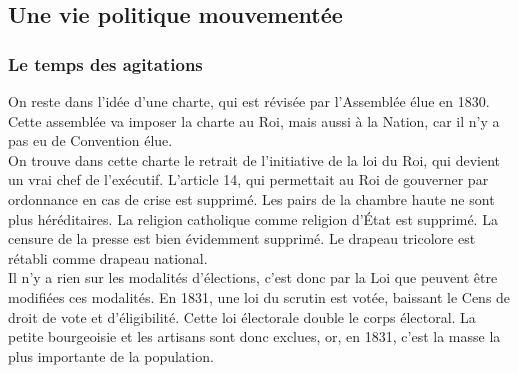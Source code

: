 \documentclass[10pt, a4paper, openany]{book}
\begin{document}
\subsection{Une vie politique mouvementée}

\subsubsection{Le temps des agitations}

On reste dans l'idée d'une charte, qui est révisée par l'Assemblée élue en 1830. Cette assemblée va imposer la charte au Roi, mais aussi à la Nation, car il n'y a pas eu de Convention élue. \\
On trouve dans cette charte le retrait de l'initiative de la loi du Roi, qui devient un vrai chef de l'exécutif. L'article 14, qui permettait au Roi de gouverner par ordonnance en cas de crise est supprimé. Les pairs de la chambre haute ne sont plus héréditaires. La religion catholique comme religion d'État est supprimé. La censure de la presse est bien évidemment supprimé. Le drapeau tricolore est rétabli comme drapeau national. \\
Il n'y a rien sur les modalités d'élections, c'est donc par la Loi que peuvent être modifiées ces modalités. En 1831, une loi du scrutin est votée, baissant le Cens de droit de vote et d'éligibilité. Cette loi électorale double le corps électoral. La petite bourgeoisie et les artisans sont donc exclues, or, en 1831, c'est la masse la plus importante de la population. 
\end{document}
